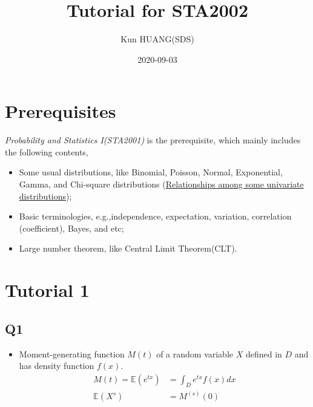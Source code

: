 \documentclass[
]{book}
\title{Tutorial for STA2002}
\author{Kun HUANG(SDS)}
\date{2020-09-03}
\providecommand{\tightlist}{%
  \setlength{\itemsep}{0pt}\setlength{\parskip}{0pt}}
\begin{document}
\maketitle

{
\setcounter{tocdepth}{1}
\tableofcontents
}
\newcommand{\E}{\mathbb{E}}
\newcommand{\Var}{\mathrm{Var}}

\hypertarget{prerequisites}{%
\chapter{Prerequisites}\label{prerequisites}}

\emph{Probability and Statistics I(STA2001)} is the prerequisite, which mainly includes the following contents,

\begin{itemize}
\item
  Some usual distributions, like Binomial, Poisson, Normal, Exponential, Gamma, and Chi-square distributions (\href{https://www.tandfonline.com/doi/pdf/10.1080/07408170590948512?needAccess=true}{Relationships among some univariate
  distributions}\citep{song2005relationships});
\item
  Basic terminologies, e.g.,independence, expectation, variation, correlation (coefficient), Bayes, and etc;
\item
  Large number theorem, like Central Limit Theorem(CLT).
\end{itemize}

\hypertarget{sec:T1}{%
\chapter{Tutorial 1}\label{sec:T1}}

\hypertarget{q1}{%
\section{Q1}\label{q1}}

\begin{itemize}
\tightlist
\item
  Moment-generating function \(M(t)\) of a random variable \(X\) defined in \(D\) and has density function \(f(x)\).
  \begin{align}
  M(t) = \E(e^{tx}) &= \int_{D} e^{tx}f(x)dx\\
  \E(X^{s}) &= M^{(s)}(0)
  \end{align}
\end{itemize}

  
\end{document}
